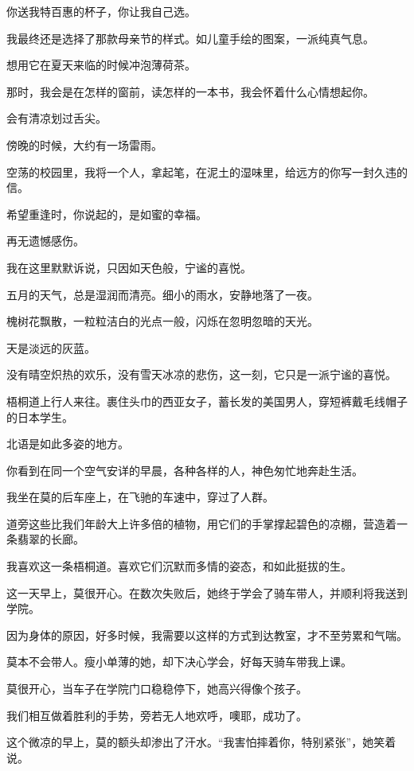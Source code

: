 		你送我特百惠的杯子，你让我自己选。\par
		我最终还是选择了那款母亲节的样式。如儿童手绘的图案，一派纯真气息。\par
		想用它在夏天来临的时候冲泡薄荷茶。\par
		那时，我会是在怎样的窗前，读怎样的一本书，我会怀着什么心情想起你。\par
		会有清凉划过舌尖。\par
		傍晚的时候，大约有一场雷雨。\par
		空荡的校园里，我将一个人，拿起笔，在泥土的湿味里，给远方的你写一封久违的信。

		希望重逢时，你说起的，是如蜜的幸福。\par
		再无遗憾感伤。

	\endwriting



		我在这里默默诉说，只因如天色般，宁谧的喜悦。


		五月的天气，总是湿润而清亮。细小的雨水，安静地落了一夜。\par
		槐树花飘散，一粒粒洁白的光点一般，闪烁在忽明忽暗的天光。\par
		天是淡远的灰蓝。\par
		没有晴空炽热的欢乐，没有雪天冰凉的悲伤，这一刻，它只是一派宁谧的喜悦。\par
		梧桐道上行人来往。裹住头巾的西亚女子，蓄长发的美国男人，穿短裤戴毛线帽子的日本学生。\par
		北语是如此多姿的地方。\par
		你看到在同一个空气安详的早晨，各种各样的人，神色匆忙地奔赴生活。

		我坐在莫的后车座上，在飞驰的车速中，穿过了人群。\par
		道旁这些比我们年龄大上许多倍的植物，用它们的手掌撑起碧色的凉棚，营造着一条翡翠的长廊。\par
		我喜欢这一条梧桐道。喜欢它们沉默而多情的姿态，和如此挺拔的生。\par
		这一天早上，莫很开心。在数次失败后，她终于学会了骑车带人，并顺利将我送到学院。\par
		因为身体的原因，好多时候，我需要以这样的方式到达教室，才不至劳累和气喘。\par
		莫本不会带人。瘦小单薄的她，却下决心学会，好每天骑车带我上课。\par
		莫很开心，当车子在学院门口稳稳停下，她高兴得像个孩子。\par
		我们相互做着胜利的手势，旁若无人地欢呼，噢耶，成功了。\par
		这个微凉的早上，莫的额头却渗出了汗水。“我害怕摔着你，特别紧张”，她笑着说。

